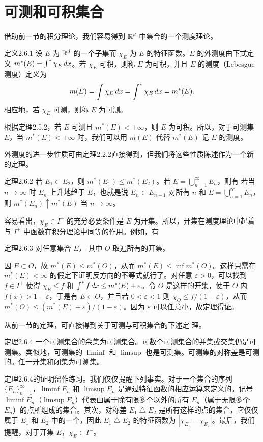 \section{可测和可积集合}
借助前一节的积分理论，我们容易得到 $\mathbb R^d$ 中集合的一个测度理论。
\begin{statement}{定义}{2.6.1}
设 $E$ 为 $\mathbb R^d$ 的一个子集而 $\chi_E$ 为 $E$ 的特征函数。$E$ 的外测度由下式定义 $m^*(E)=\int^{*}\chi_E\,dx$。若 $\chi_E$ 可积，则称 $E$ 为可积，并且 $E$ 的测度（Lebesgue 测度）定义为
\[m(E)=\int\chi_E\,dx=\int^{*}\chi_E\,dx=m^*(E).\]
相应地，若 $\chi_E$ 可测，则称 $E$ 为可测。
\end{statement}
根据定理2.5.2，若 $E$ 可测且 $m^*(E)<+\infty$，则 $E$ 为可积。所以，对于可测集 $E$，当 $m^*(E)<+\infty$ 时，我们可以用 $m(E)$ 代替
$m^*(E)$ 记 $E$ 的测度。

外测度的进一步性质可由定理2.2.2直接得到，但我们将这些性质陈述作为一个新的定理。
\begin{statement}{定理}{2.6.2}
若 $E_1\subset E_2$，则 $m^*(E_1)\le m^*(E_2)$。若 $E=\bigcup_{n=1}^\infty E_n$，则有
若当 $n\to\infty$ 时 $E_n$ 上升地趋于 $E$，也就是说 $E_n\subset E_{n+1}$ 对所有 $n$ 和 $E=\bigcup_{n=1}^\infty E_n$，则 $m^*(E_n)\uparrow m^*(E)$ 当 $n\to\infty$。
\end{statement}
容易看出，$\chi_E\in I^+$ 的充分必要条件是 $E$ 为开集。所以，开集在测度理论中起着与 $I^+$ 中函数在积分理论中同等的作用。例如，有
\begin{statement}{定理}{2.6.3}
对任意集合 $E$，
其中 $O$ 取遍所有的开集。
\end{statement}
\Proof 因 $E\subset O$，故 $m^*(E)\le m^*(O)$，从而 $m^*(E)\le\inf m^*(O)$。这样只需在 $m^*(E)<\infty$ 的假定下证明反方向的不等式就行了。对任意 $\varepsilon>0$，可以找到 $f\in I^+$ 使得 $\chi_E\le f$ 和 $\int^{*} f\,dx\le m^*(E)+\varepsilon$。令 $O$ 是这样的开集，使于 $O$ 内 $f(x)>1-\varepsilon$，于是有 $E\subset O$，并且若 $0<\varepsilon<1$ 则 $\chi_O\le f/(1-\varepsilon)$，从而 $m^*(O)\le(m^*(E)+\varepsilon)/(1-\varepsilon)$。因为 $\varepsilon$ 可以任意小，故定理得证。

从前一节的定理，可直接得到关于可测与可积集合的下述定
理。
\begin{statement}{定理}{2.6.4}
一个可测集合的余集为可测集合。可数个可测集合的并集或交集仍是可测集。类似地，可测集的 $\liminf$ 和 $\limsup$ 也是可测集。可测集的对称差是可测的。任一开集和闭集为可测集。
\end{statement}
定理2.6.4的证明留作练习。我们仅仅提醒下列事实。对于一个集合的序列 $\{E_n\}_{n=1}^\infty$，$\liminf E_n$ 和 $\limsup E_n$ 是通过特征函数的相应运算来定义的。记号 $\liminf E_n$（$\limsup E_n$）代表由属于除有限多个以外的所有 $E_n$（属于无限多个 $E_n$）的点所组成的集合。其次，对称差 $E_1\mathbin\triangle E_2$ 是所有这样的点的集合，它仅仅属于 $E_1$ 和 $E_2$ 中的一个，因此 $E_1\mathbin\triangle E_2$ 的特征函数为 $|\chi_{E_1}-\chi_{E_2}|$。最后，我们提醒，对于开集 $E$，$\chi_E\in I^+$。

